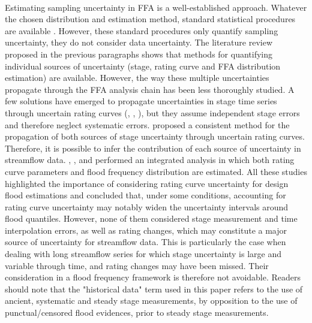 \documentclass[11pt]{article}
\begin{document}
    \paragraph{}
Estimating sampling uncertainty in FFA is a well-established approach. Whatever     the chosen distribution and estimation method, standard statistical procedures are available \citep{beven_applied_2014}. However, these standard procedures only quantify sampling uncertainty, they do not consider data uncertainty. The literature review proposed in the previous paragraphs shows that methods for quantifying individual sources of uncertainty (stage, rating curve and FFA distribution estimation) are available. However, the way these multiple uncertainties propagate through the FFA analysis chain has been less thoroughly studied. A few solutions have emerged to propagate uncertainties in stage time series through uncertain rating curves (\citet{dymond_accuracy_1982}, \citet{herschy_hydrometry_1998}, \citet{petersen-overleir_uncertainty_2005}), but they assume independent stage errors and therefore neglect systematic errors. \citet{horner_impact_2018} proposed a consistent method for the propagation of both sources of stage uncertainty through uncertain rating curves. Therefore, it is possible to infer the contribution of each source of uncertainty in streamflow data. \citet{petersen-overleir_accounting_2009}, \citet{steinbakk_propagation_2016}, and \citet{vieira_assessing_2022} performed an integrated analysis in which both rating curve parameters and flood frequency distribution are estimated. All these studies highlighted the importance of considering rating curve uncertainty for design flood estimations and concluded that, under some conditions, accounting for rating curve uncertainty may notably widen the uncertainty intervals around flood quantiles. However, none of them considered stage measurement and time interpolation errors, as well as rating changes, which may constitute a major source of uncertainty for streamflow data. This is particularly the case when dealing with long streamflow series for which stage uncertainty is large and variable through time, and rating changes may have been missed. Their consideration in a flood frequency framework is therefore not avoidable. 
Readers should note that the "historical data" term used in this paper refers to the use of ancient, systematic and steady stage measurements, by opposition to the use of punctual/censored flood evidences, prior to steady stage measurements. 
    
\end{document}
